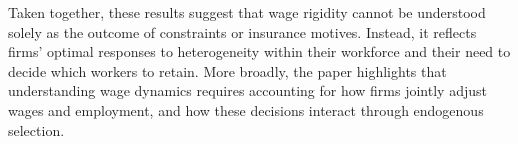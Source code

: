 \documentclass[12pt]{article}
\begin{document}
Taken together, these results suggest that wage rigidity cannot be understood solely as the outcome of constraints or insurance motives. Instead, it reflects firms’ optimal responses to heterogeneity within their workforce and their need to decide which workers to retain. More broadly, the paper highlights that understanding wage dynamics requires accounting for how firms jointly adjust wages and employment, and how these decisions interact through endogenous selection.



\newpage
\printbibliography %



%
\end{document}
